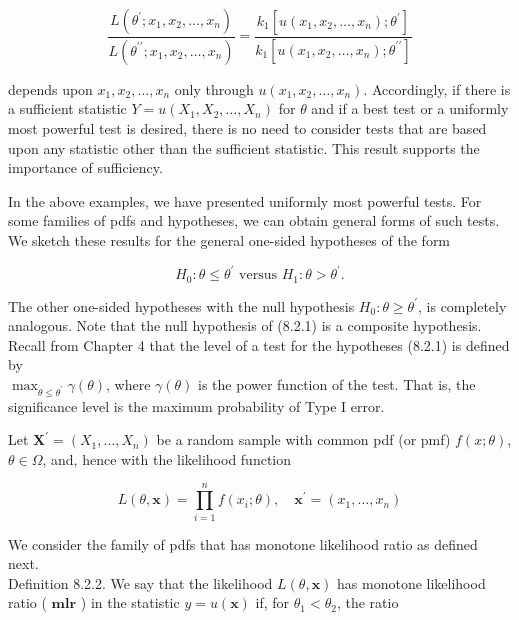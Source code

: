 $$
\frac{L\left(\theta^{\prime} ; x_{1}, x_{2}, \ldots, x_{n}\right)}{L\left(\theta^{\prime \prime} ; x_{1}, x_{2}, \ldots, x_{n}\right)}=\frac{k_{1}\left[u\left(x_{1}, x_{2}, \ldots, x_{n}\right) ; \theta^{\prime}\right]}{k_{1}\left[u\left(x_{1}, x_{2}, \ldots, x_{n}\right) ; \theta^{\prime \prime}\right]}
$$

depends upon $x_{1}, x_{2}, \ldots, x_{n}$ only through $u\left(x_{1}, x_{2}, \ldots, x_{n}\right)$. Accordingly, if there is a sufficient statistic $Y=u\left(X_{1}, X_{2}, \ldots, X_{n}\right)$ for $\theta$ and if a best test or a uniformly most powerful test is desired, there is no need to consider tests that are based upon any statistic other than the sufficient statistic. This result supports the importance of sufficiency.

In the above examples, we have presented uniformly most powerful tests. For some families of pdfs and hypotheses, we can obtain general forms of such tests. We sketch these results for the general one-sided hypotheses of the form


\begin{equation*}
H_{0}: \theta \leq \theta^{\prime} \text { versus } H_{1}: \theta>\theta^{\prime} . \tag{8.2.1}
\end{equation*}


The other one-sided hypotheses with the null hypothesis $H_{0}: \theta \geq \theta^{\prime}$, is completely analogous. Note that the null hypothesis of (8.2.1) is a composite hypothesis. Recall from Chapter 4 that the level of a test for the hypotheses (8.2.1) is defined by\\
$\max _{\theta \leq \theta^{\prime}} \gamma(\theta)$, where $\gamma(\theta)$ is the power function of the test. That is, the significance level is the maximum probability of Type I error.

Let $\mathbf{X}^{\prime}=\left(X_{1}, \ldots, X_{n}\right)$ be a random sample with common pdf (or pmf) $f(x ; \theta)$, $\theta \in \Omega$, and, hence with the likelihood function

$$
L(\theta, \mathbf{x})=\prod_{i=1}^{n} f\left(x_{i} ; \theta\right), \quad \mathbf{x}^{\prime}=\left(x_{1}, \ldots, x_{n}\right)
$$

We consider the family of pdfs that has monotone likelihood ratio as defined next.\\
Definition 8.2.2. We say that the likelihood $L(\theta, \mathbf{x})$ has monotone likelihood ratio ( $\mathbf{m l r}$ ) in the statistic $y=u(\mathbf{x})$ if, for $\theta_{1}<\theta_{2}$, the ratio


